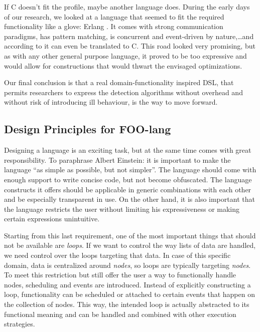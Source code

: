 \documentclass[conference]{IEEEtran}
\begin{document}
If C doesn't fit the profile, maybe another language does. During the early
days of our research, we looked at a language that seemed to fit the required
functionality like a glove: Erlang \cite{armstrong1993concurrent}. It comes
with strong communication paradigms, has pattern matching, is concurrent and
event-driven by nature,\dots and according to \cite{wong1998compiling} it can
even be translated to C. This road looked very promising, but as with any other
general purpose language, it proved to be too expressive and would allow for
constructions that would thwart the envisaged optimizations.

Our final conclusion is that a real domain-functionality inspired DSL, that
permits researchers to express the detection algorithms without overhead and
without risk of introducing ill behaviour, is the way to move forward.

\subsection{Design Principles for FOO-lang}
\label{subsection:design}

Designing a language is an exciting task, but at the same time comes with great
responsibility. To paraphrase Albert Einstein: it is important to make the
language ``as simple as possible, but not simpler''. The language should come
with enough support to write concise code, but not become obfuscated. The
language constructs it offers should be applicable in generic combinations with
each other and be especially transparent in use. On the other hand, it is also
important that the language restricts the user without limiting his
expressiveness or making certain expressions unintuitive.

Starting from this last requirement, one of the most important things that
should not be available are \emph{loops}. If we want to control the way lists
of data are handled, we need control over the loops targeting that data. In
case of this specific domain, data is centralized around \emph{nodes}, so loops
are typically targeting \emph{nodes}. To meet this restriction but still offer
the user a way to functionally handle nodes, scheduling and events are
introduced. Instead of explicitly constructing a loop, functionality can be
scheduled or attached to certain events that happen on the collection of nodes.
This way, the intended loop is actually abstracted to its functional meaning
and can be handled and combined with other execution strategies.
\end{document}

